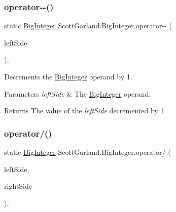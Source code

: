 \subsubsection{\texorpdfstring{operator-\/-\/()}{operator--()}}
{\footnotesize\ttfamily static \hyperlink{class_scott_garland_1_1_big_integer}{Big\+Integer} Scott\+Garland.\+Big\+Integer.\+operator-\/-\/ (\begin{DoxyParamCaption}\item[{\hyperlink{class_scott_garland_1_1_big_integer}{Big\+Integer}}]{left\+Side }\end{DoxyParamCaption})\hspace{0.3cm}{\ttfamily [inline]}, {\ttfamily [static]}}



Decrements the \hyperlink{class_scott_garland_1_1_big_integer}{Big\+Integer} operand by 1. 


\begin{DoxyParams}{Parameters}
{\em left\+Side} & The \hyperlink{class_scott_garland_1_1_big_integer}{Big\+Integer} operand.\\
\hline
\end{DoxyParams}
\begin{DoxyReturn}{Returns}
The value of the {\itshape left\+Side}  decremented by 1.
\end{DoxyReturn}
\mbox{\label{class_scott_garland_1_1_big_integer_a021e7c5201d241d86b1fbdc4efa3c137}} 
\subsubsection{\texorpdfstring{operator/()}{operator/()}}
{\footnotesize\ttfamily static \hyperlink{class_scott_garland_1_1_big_integer}{Big\+Integer} Scott\+Garland.\+Big\+Integer.\+operator/ (\begin{DoxyParamCaption}\item[{\hyperlink{class_scott_garland_1_1_big_integer}{Big\+Integer}}]{left\+Side,  }\item[{\hyperlink{class_scott_garland_1_1_big_integer}{Big\+Integer}}]{right\+Side }\end{DoxyParamCaption})\hspace{0.3cm}{\ttfamily [inline]}, {\ttfamily [static]}}



